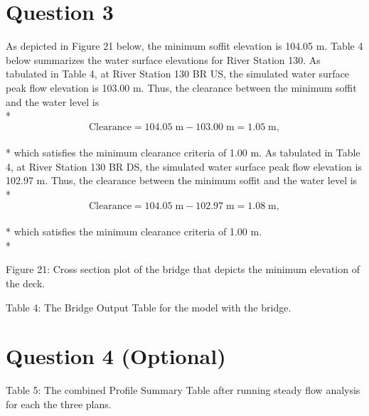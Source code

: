 \documentclass[]{article}
\begin{document}
\section{Question 3} 
As depicted in Figure 21 below, the minimum soffit elevation is 104.05 m. Table 4 below summarizes the water surface elevations for River Station 130. As tabulated in Table 4, at River Station 130 BR US, the simulated water surface peak flow elevation is 103.00 m. Thus, the clearance between the minimum soffit and the water level is \\*  
\begin{equation}
\nonumber
\text{Clearance} = 104.05 \; \text{m} - 103.00 \; \text{m} = 1.05 \; \text{m},
\end{equation} \\* 
which satisfies the minimum clearance criteria of 1.00 m. As tabulated in Table 4, at River Station 130 BR DS, the simulated water surface peak flow elevation is 102.97 m. Thus, the clearance between the minimum soffit and the water level is \\*  
\begin{equation}
\nonumber
\text{Clearance} = 104.05 \; \text{m} - 102.97 \; \text{m} = 1.08 \; \text{m},
\end{equation} \\* 
which satisfies the minimum clearance criteria of 1.00 m. \\*
\begin{minipage}[t]{\linewidth}
	\vspace{1cm}
	\centering
	
	\medskip
	\begin{center} 
		Figure 21: Cross section plot of the bridge that depicts the minimum elevation of the deck.
	\end{center}
\bigskip
\centering
{}

\medskip
\begin{center} 
	Table 4: The Bridge Output Table for the model with the bridge.
\end{center}
\end{minipage}
\newpage
\section{Question 4 (Optional)} 
\medskip
\begin{minipage}[t]{\linewidth}
	\raggedright
	
	\begin{center} 
		Table 5: The combined Profile Summary Table after running steady flow analysis for each the three plans.
	\end{center}
\end{minipage}
\newpage
\end{document}
